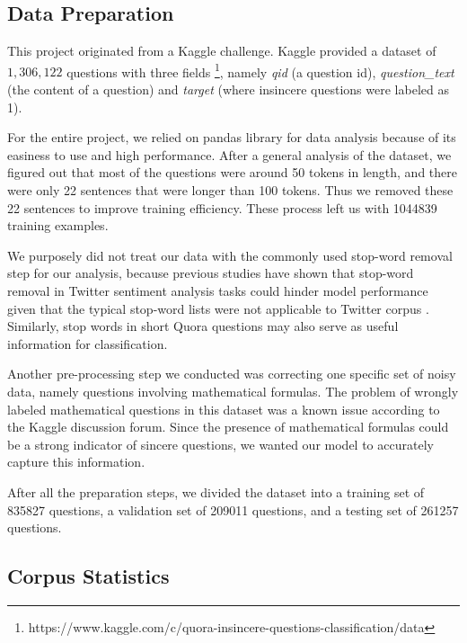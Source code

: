 \documentclass[12pt]{diazessay} %
\begin{document}
{\subsection{Data Preparation} \label{data}
This project originated from a Kaggle challenge. Kaggle provided a dataset of $1,306,122$ questions with three fields \footnote{https://www.kaggle.com/c/quora-insincere-questions-classification/data}, namely \textit{qid} (a question id), \textit{question\_text} (the content of a question) and \textit{target} (where insincere questions were labeled as 1). 

For the entire project, we relied on pandas library for data analysis because of its easiness to use and high performance. After a general analysis of the dataset, we figured out that most of the questions were around 50 tokens in length, and there were only 22 sentences that were longer than 100 tokens. Thus we removed these 22 sentences to improve training efficiency. These process left us with \num[group-separator={,}]{1044839} training examples.  

We purposely did not treat our data with the commonly used stop-word removal step for our analysis, because previous studies have shown that stop-word removal in Twitter sentiment analysis tasks could hinder model performance given that the typical stop-word lists were not applicable to Twitter corpus \citep{giachanou2016}. Similarly, stop words in short Quora questions may also serve as useful information for classification. 

Another pre-processing step we conducted was correcting one specific set of noisy data, namely questions involving mathematical formulas. The problem of wrongly labeled mathematical questions in this dataset was a known issue according to the Kaggle discussion forum. Since the presence of mathematical formulas could be a strong indicator of sincere questions, we wanted our model to accurately capture this information.

After all the preparation steps, we divided the dataset into a training set of 835827 questions, a validation set of 209011 questions, and a testing set of 261257 questions. 

\subsection{Corpus Statistics} \label{corpus-stats}

}
\end{document}

